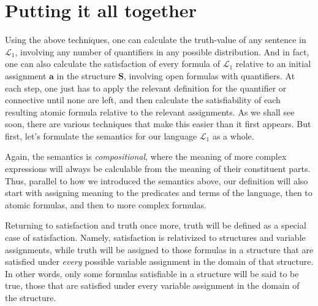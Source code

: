 \section{Putting it all together}

Using the above techniques, one can calculate the truth-value of any sentence in $\mathcal{L}_1$, involving any number of quantifiers in any possible distribution. And in fact, one can also calculate the satisfaction of every formula of $\mathcal{L}_1$ relative to an initial assignment $\mathbf{a}$ in the structure $\mathbf{S}$, involving open formulas with quantifiers. At each step, one just has to apply the relevant definition for the quantifier or connective until none are left, and then calculate the satisfiability of each resulting atomic formula relative to the relevant assignments. As we shall see soon, there are various techniques that make this easier than it first appears. But first, let's formulate the semantics for our language $\mathcal{L}_1$ as a whole. 

Again, the semantics is \textit{compositional}, where the meaning of more complex expressions will always be calculable from the meaning of their constituent parts. Thus, parallel to how we introduced the semantics above, our definition will also start with assigning meaning to the predicates and terms of the language, then to atomic formulas, and then to more complex formulas. 

Returning to satisfaction and truth once more, truth will be defined as a special case of satisfaction. Namely, satisfaction is relativized to structures and variable assignments, while truth will be assigned to those formulas in a structure that are satisfied under \textit{every} possible variable assignment in the domain of that structure. In other words, only some formulas satisfiable in a structure will be said to be true, those that are satisfied under every variable assignment in the domain of the structure. 


